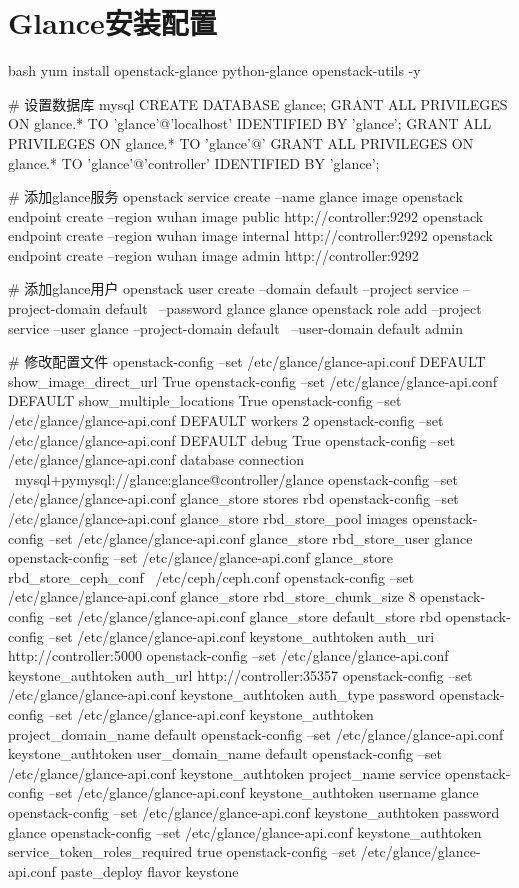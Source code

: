 \section{Glance安装配置}
\label{glance_install}
\begin{code-block}{bash}
yum install openstack-glance python-glance openstack-utils -y

# 设置数据库
mysql
CREATE DATABASE glance;
GRANT ALL PRIVILEGES ON glance.* TO 'glance'@'localhost' IDENTIFIED BY 'glance';
GRANT ALL PRIVILEGES ON glance.* TO 'glance'@'%
GRANT ALL PRIVILEGES ON glance.* TO 'glance'@'controller' IDENTIFIED BY 'glance';

# 添加glance服务
openstack service create --name glance  image
openstack endpoint create --region wuhan image public http://controller:9292
openstack endpoint create --region wuhan image internal http://controller:9292
openstack endpoint create --region wuhan image admin http://controller:9292

# 添加glance用户
openstack user create --domain default --project service --project-domain default \
    --password glance glance
openstack role add --project service --user glance --project-domain default \
    --user-domain default admin

# 修改配置文件
openstack-config --set /etc/glance/glance-api.conf DEFAULT show_image_direct_url True
openstack-config --set /etc/glance/glance-api.conf DEFAULT show_multiple_locations True
openstack-config --set /etc/glance/glance-api.conf DEFAULT workers 2
openstack-config --set /etc/glance/glance-api.conf DEFAULT debug True
openstack-config --set /etc/glance/glance-api.conf database connection \
    mysql+pymysql://glance:glance@controller/glance
openstack-config --set /etc/glance/glance-api.conf glance_store stores rbd
openstack-config --set /etc/glance/glance-api.conf glance_store rbd_store_pool images
openstack-config --set /etc/glance/glance-api.conf glance_store rbd_store_user glance
openstack-config --set /etc/glance/glance-api.conf glance_store rbd_store_ceph_conf \
    /etc/ceph/ceph.conf
openstack-config --set /etc/glance/glance-api.conf glance_store rbd_store_chunk_size 8
openstack-config --set /etc/glance/glance-api.conf glance_store default_store rbd
openstack-config --set /etc/glance/glance-api.conf keystone_authtoken auth_uri http://controller:5000
openstack-config --set /etc/glance/glance-api.conf keystone_authtoken auth_url http://controller:35357
openstack-config --set /etc/glance/glance-api.conf keystone_authtoken auth_type password
openstack-config --set /etc/glance/glance-api.conf keystone_authtoken project_domain_name default
openstack-config --set /etc/glance/glance-api.conf keystone_authtoken user_domain_name default
openstack-config --set /etc/glance/glance-api.conf keystone_authtoken project_name service
openstack-config --set /etc/glance/glance-api.conf keystone_authtoken username glance
openstack-config --set /etc/glance/glance-api.conf keystone_authtoken password glance
openstack-config --set /etc/glance/glance-api.conf keystone_authtoken service_token_roles_required true
openstack-config --set /etc/glance/glance-api.conf paste_deploy flavor keystone


\end{code-block}
